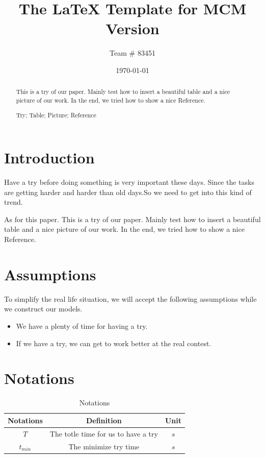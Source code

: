 \documentclass{mcmthesis}
\title{The \LaTeX{} Template for MCM Version \MCMversion}
\author{\small Team \# 83451}
\date{\today}
\begin{document}
\begin{abstract}

This is a try of our paper. Mainly test how to insert a beautiful table and a nice picture of our work. In the end, we tried how to show a nice Reference.

\begin{keywords}
  Try; Table; Picture; Reference
\end{keywords}
\end{abstract}
\maketitle

\tableofcontents
\newpage

\section{Introduction}

    Have a try before doing something is very important these days. Since the tasks are getting harder and harder than old days.So we need to get into this kind of trend.

    As for this paper. This is a try of our paper. Mainly test how to insert a beautiful table and a nice picture of our work. In the end, we tried how to show a nice Reference.\cite{crocker1986introduction}

\section{Assumptions}

    To simplify the real life situation, we will accept the following assumptions while we construct our models.

    \begin{itemize}

      \item We have a plenty of time for having a try.
      \item If we have a try, we can get to work better at the real contest.

    \end{itemize}

\section{Notations}

    \begin{table}[h]
      \centering
        \begin{tabular}{|c|c|c|}

          \hline Notations & Definition & Unit \\
          \hline $T$ & The totle time for us to have a try & $s$ \\
          \hline $t_{min}$ & The minimize try time & $s$ \\
          \hline

        \end{tabular}
        \caption{Notations}
    		\label{tab:Notations}
    \end{table}
\end{document}
